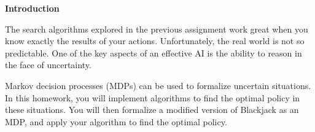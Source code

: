 {\bf Introduction}

The search algorithms explored in the previous assignment work great when you
know exactly the results of your actions.  Unfortunately, the real world is not
so predictable.  One of the key aspects of an effective AI is the ability to
reason in the face of uncertainty.

Markov decision processes (MDPs) can be used to formalize uncertain situations.
In this homework, you will implement algorithms to find the optimal policy in
these situations. You will then formalize a modified version of Blackjack as an
MDP, and apply your algorithm to find the optimal policy.
